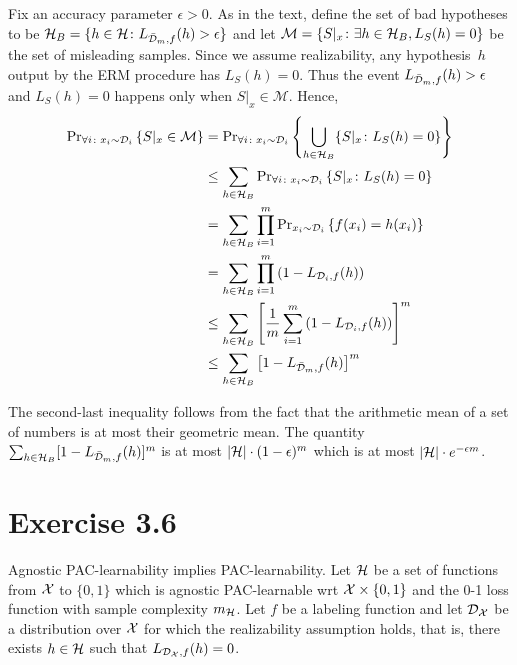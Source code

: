 Fix an accuracy parameter $\epsilon > 0$. As in the text, define the set of bad
hypotheses to be $\mathcal{H}_{B} = \{h \in \mathcal{H} \colon L_{\bar{\mathcal{D}}_m, f}
(h) > \epsilon\}$ and let $\mathcal{M} = \{S \vert_x \colon \exists h \in
\mathcal{H}_{B}, L_S(h) = 0\}$ be the set of misleading samples. Since we assume
realizability, any hypothesis~$h$ output by the ERM procedure has $L_S(h) =
0$. Thus the event $L_{\bar{\mathcal{D}}_m, f} (h) > \epsilon$ and $L_S(h) = 0$
happens only when $S \vert_x \in \mathcal{M}$. Hence,
\begin{align*}
	\text{Pr}_{\forall i \colon x_i \sim \mathcal{D}_i} \left \{ S \vert_x \in \mathcal{M} \right \} 
	& = \text{Pr}_{\forall i \colon x_i \sim \mathcal{D}_i} \left \{ \bigcup_{h \in \mathcal{H}_{B}} 
			   \{S \vert_x \colon L_S(h) = 0\} \right \} \\
    & \leq \sum_{h \in \mathcal{H}_B} 
    		\text{Pr}_{\forall i \colon x_i \sim \mathcal{D}_i} \left \{ S \vert_x \colon L_S(h) = 0 \right \} \\
    & = \sum_{h \in \mathcal{H}_B}  
    		\prod_{i = 1}^{m} \text{Pr}_{x_i \sim \mathcal{D}_i} \left \{ f(x_i) = h(x_i) \right \} \\
    & =  \sum_{h \in \mathcal{H}_B}  
    		\prod_{i = 1}^{m} \left ( 1 - L_{\mathcal{D}_i, f} (h) \right ) \\
    & \leq \sum_{h \in \mathcal{H}_B} \left [ 
            \frac{1}{m} \sum_{i = 1}^{m} \left ( 1 - L_{\mathcal{D}_i, f} (h) \right )
        \right ]^m \\
    & \leq \sum_{h \in \mathcal{H}_B} \left [ 1 - L_{\bar{\mathcal{D}}_{m}, f} (h)\right ]^m 
\end{align*}

The second-last inequality follows from the fact that the arithmetic mean of a set of numbers 
is at most their geometric mean. The quantity 
$\sum_{h \in \mathcal{H}_B} [ 1 - L_{\bar{\mathcal{D}}_{m}, f} (h)]^m$ 
is at most $| \mathcal{H} | \cdot (1 - \epsilon)^m $ which is at most 
$| \mathcal{H} | \cdot e^{- \epsilon m}$.

\section*{Exercise 3.6}

Agnostic PAC-learnability implies PAC-learnability. Let $\mathcal{H}$ be a set of
functions from $\mathcal{X}$ to $\{0, 1\}$ which is agnostic PAC-learnable wrt $\mathcal{X}
\times \{0, 1\}$ and the 0-1 loss function with sample complexity
$m_{\mathcal{\mathcal{H}}}$.  Let $f$ be a labeling function and let
$\mathcal{D}_{\mathcal{X}}$ be a distribution over $\mathcal{X}$ for which the realizability
assumption holds, that is, there exists $h \in \mathcal{H}$ such that
$L_{\mathcal{D}_{\mathcal{X}}, f } (h) = 0$. 

